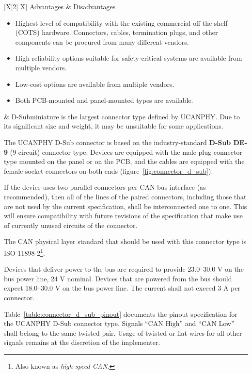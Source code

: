 {
\NoLeftSkip
\begin{UAVCANCompactTable}{|X[2] X|}
    Advantages & Disadvantages \\
    \begin{itemize}
        \item Highest level of compatibility with the existing commercial off the shelf (COTS) hardware.
        Connectors, cables, termination plugs, and other components can be procured from many different vendors.
        \item High-reliability options suitable for safety-critical systems are available from multiple vendors.
        \item Low-cost options are available from multiple vendors.
        \item Both PCB-mounted and panel-mounted types are available.
    \end{itemize}
    &
    D-Subminiature is the largest connector type defined by UCANPHY.
    Due to its significant size and weight, it may be unsuitable for some applications.
\end{UAVCANCompactTable}
}

The UCANPHY D-Sub connector is based on the industry-standard \textbf{D-Sub DE-9} (9-circuit) connector type.
Devices are equipped with the male plug connector type mounted on the panel or on the PCB,
and the cables are equipped with the female socket connectors on both ends
(figure~\ref{fig:connector_d_sub}).

If the device uses two parallel connectors per CAN bus interface (as recommended),
then all of the lines of the paired connectors,
including those that are not used by the current specification,
shall be interconnected one to one.
This will ensure compatibility with future revisions of the specification that make use of
currently unused circuits of the connector.

The CAN physical layer standard that should be used with this connector type is
ISO 11898-2\footnote{Also known as \emph{high-speed CAN}.}.

Devices that deliver power to the bus are required to provide 23.0--30.0 V on the bus power line, 24 V nominal.
Devices that are powered from the bus should expect 18.0--30.0 V on the bus power line.
The current shall not exceed 3 A per connector.

Table~\ref{table:connector_d_sub_pinout} documents the pinout specification for the
UCANPHY D-Sub connector type.
Signals ``CAN High'' and ``CAN Low'' shall belong to the same twisted pair.
Usage of twisted or flat wires for all other signals remains at the discretion of the implementer.

